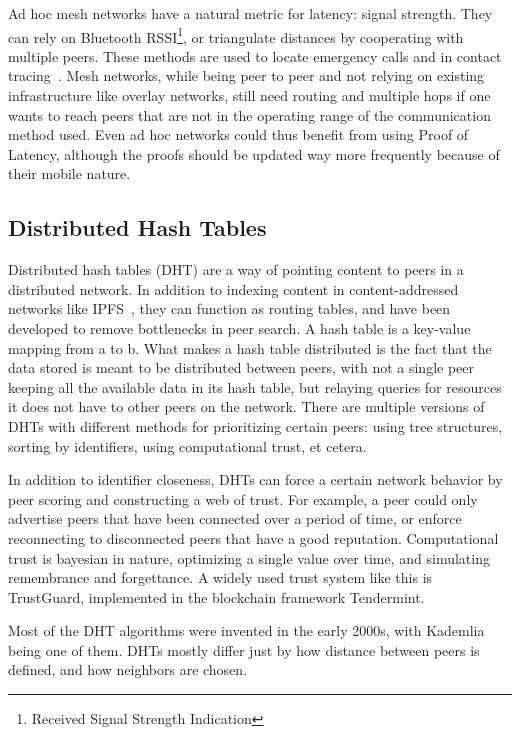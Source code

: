 Ad hoc mesh networks have a natural metric for latency: signal strength. They can rely on Bluetooth RSSI\footnote{Received Signal Strength Indication}, or triangulate distances by cooperating with multiple peers. These methods are used to locate emergency calls and in contact tracing~\cite{Biddle2020-kl}. Mesh networks, while being peer to peer and not relying on existing infrastructure like overlay networks, still need routing and multiple hops if one wants to reach peers that are not in the operating range of the communication method used. Even ad hoc networks could thus benefit from using Proof of Latency, although the proofs should be updated way more frequently because of their mobile nature.

\subsection{Distributed Hash Tables}
Distributed hash tables (DHT) are a way of pointing content to peers in a distributed network. In addition to indexing content in content-addressed networks like IPFS~\cite{Labs_undated-uw}, they can function as routing tables, and have been developed to remove bottlenecks in peer search. A hash table is a key-value mapping from a to b. What makes a hash table distributed is the fact that the data stored is meant to be distributed between peers, with not a single peer keeping all the available data in its hash table, but relaying queries for resources it does not have to other peers on the network. There are multiple versions of DHTs with different methods for prioritizing certain peers: using tree structures, sorting by identifiers, using computational trust, et cetera.

In addition to identifier closeness, DHTs can force a certain network behavior by peer scoring and constructing a web of trust. For example, a peer could only advertise peers that have been connected over a period of time, or enforce reconnecting to disconnected peers that have a good reputation. Computational trust is bayesian in nature, optimizing a single value over time, and simulating remembrance and forgettance. A widely used trust system like this is TrustGuard, implemented in the blockchain framework Tendermint.~\cite{Srivatsa2005-ib, Jeff_Foley2018-zt}

Most of the DHT algorithms were invented in the early 2000s, with Kademlia being one of them. DHTs mostly differ just by how distance between peers is defined, and how neighbors are chosen.~\cite{Cai2015-ra}

